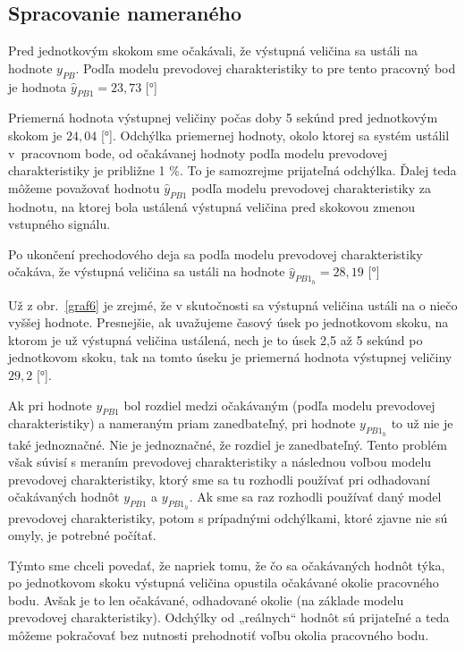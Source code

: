 \documentclass[a4paper, 10pt, ]{article}
\begin{document}
\subsection{Spracovanie nameraného}


Pred jednotkovým skokom sme očakávali, že výstupná veličina sa ustáli na hodnote $y_{PB}$. Podľa modelu prevodovej charakteristiky to pre tento pracovný bod je hodnota $\hat y_{PB1} = 23,73$ [°]


Priemerná hodnota výstupnej veličiny počas doby 5 sekúnd pred jednotkovým skokom je $24,04$ [°]. Odchýlka priemernej hodnoty, okolo ktorej sa systém ustálil v~pracovnom bode, od očakávanej hodnoty podľa modelu prevodovej charakteristiky je približne 1 \%. To je samozrejme prijateľná odchýlka. Ďalej teda môžeme považovať hodnotu $\hat y_{PB1}$ podľa modelu prevodovej charakteristiky za hodnotu, na ktorej bola ustálená výstupná veličina pred skokovou zmenou vstupného signálu.

Po ukončení prechodového deja sa podľa modelu prevodovej charakteristiky očakáva, že výstupná veličina sa ustáli na hodnote $\hat y_{PB1_h} = 28,19$ [°]

Už z obr.~\ref{graf6} je zrejmé, že v skutočnosti sa výstupná veličina ustáli na o niečo vyššej hodnote. Presnejšie, ak uvažujeme časový úsek po jednotkovom skoku, na ktorom je už výstupná veličina ustálená, nech je to úsek 2,5 až 5 sekúnd po jednotkovom skoku, tak na tomto úseku je priemerná hodnota výstupnej veličiny $29,2$ [°].



Ak pri hodnote $y_{PB1}$ bol rozdiel medzi očakávaným (podľa modelu prevodovej charakteristiky) a nameraným priam zanedbateľný, pri hodnote $y_{PB1_h}$ to už nie je také jednoznačné. Nie je jednoznačné, že rozdiel je zanedbateľný. Tento problém však súvisí s meraním prevodovej charakteristiky a následnou voľbou modelu prevodovej charakteristiky, ktorý sme sa tu rozhodli používať pri odhadovaní očakávaných hodnôt $y_{PB1}$ a $y_{PB1_h}$. Ak sme sa raz rozhodli používať daný model prevodovej charakteristiky, potom s prípadnými odchýlkami, ktoré zjavne nie sú omyly, je potrebné počítať.

Týmto sme chceli povedať, že napriek tomu, že čo sa očakávaných hodnôt týka, po jednotkovom skoku výstupná veličina opustila očakávané okolie pracovného bodu. Avšak je to len očakávané, odhadované okolie (na základe modelu prevodovej charakteristiky). Odchýlky od „reálnych“ hodnôt sú prijateľné a teda môžeme pokračovať bez nutnosti prehodnotiť voľbu okolia pracovného bodu.
\end{document}
